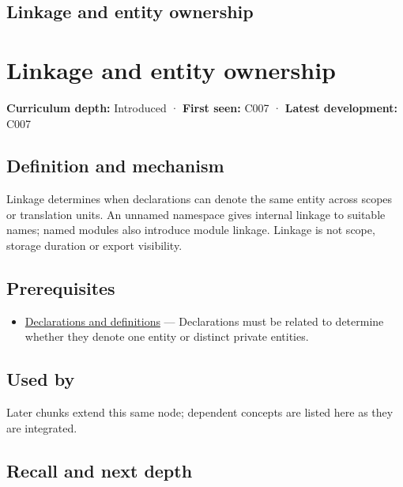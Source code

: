 \hypertarget{appendix-74a0ec818c18}{}
\section*{Linkage and entity ownership}
\chapter{Linkage and entity ownership}\label{appendix-74a0ec818c18-linkage-and-entity-ownership}

\textbf{Curriculum depth:} Introduced · \textbf{First seen:} C007 · \textbf{Latest development:} C007

\section{Definition and mechanism}\label{appendix-74a0ec818c18-definition-and-mechanism}

Linkage determines when declarations can denote the same entity across scopes or translation units. An unnamed namespace gives internal linkage to suitable names; named modules also introduce module linkage. Linkage is not scope, storage duration or export visibility.

\section{Prerequisites}\label{appendix-74a0ec818c18-prerequisites}

\begin{itemize}
\tightlist
\item
  \hyperref[appendix-2e4d494c2d94]{Declarations and definitions} --- Declarations must be related to determine whether they denote one entity or distinct private entities.
\end{itemize}

\section{Used by}\label{appendix-74a0ec818c18-used-by}

Later chunks extend this same node; dependent concepts are listed here as they are integrated.

\section{Recall and next depth}\label{appendix-74a0ec818c18-recall-and-next-depth}

